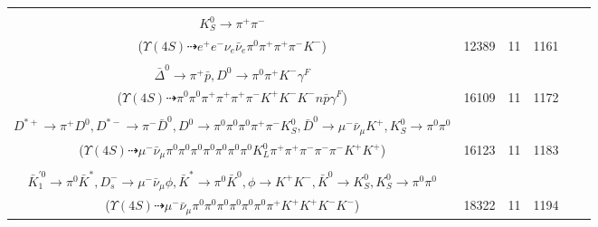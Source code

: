 \documentclass[landscape]{article}
\newcounter{rownumbers}
\newcommand\rn{\stepcounter{rownumbers}\arabic{rownumbers}}
\newcommand{\EOLP}{\\ \hline} %
\newcommand{\topoTags}[1]{#1} %
\begin{document}
\begin{longtable}{clcccc}
\rn & \makecell[l]{ $ 
\Upsilon(4S) \rightarrow B^{0} \bar{B}^{0} ,
B^{0} \rightarrow e^{+} \nu_{e} D^{-} ,
\bar{B}^{0} \rightarrow K^{-} \rho^{+}(1450) ,
D^{-} \rightarrow e^{-} \bar{\nu}_{e} K^{0} ,
\rho^{+}(1450) \rightarrow \pi^{0} \pi^{+} ,
K^{0} \rightarrow K_{S}^{0} ,
$ \\ $
K_{S}^{0} \rightarrow \pi^{+} \pi^{-} 
$ \\ ($
\Upsilon(4S) \dashrightarrow e^{+} e^{-} \nu_{e} \bar{\nu}_{e} \pi^{0} \pi^{+} \pi^{+} \pi^{-} K^{-} 
$) } & \topoTags{12389 & }11 & 1161 \EOLP

\rn & \makecell[l]{ $ 
\Upsilon(4S) \rightarrow B^{0} \bar{B}^{0} ,
B^{0} \rightarrow K^{-} K^{*+} ,
\bar{B}^{0} \rightarrow D^{*+} \Delta^{-} \bar{\Delta}^{0} ,
K^{*+} \rightarrow \pi^{0} K^{+} ,
D^{*+} \rightarrow \pi^{+} D^{0} ,
\Delta^{-} \rightarrow \pi^{-} n ,
$ \\ $
\bar{\Delta}^{0} \rightarrow \pi^{+} \bar{p} ,
D^{0} \rightarrow \pi^{0} \pi^{+} K^{-} \gamma^{F} 
$ \\ ($
\Upsilon(4S) \dashrightarrow \pi^{0} \pi^{0} \pi^{+} \pi^{+} \pi^{+} \pi^{-} K^{+} K^{-} K^{-} n \bar{p} \gamma^{F} 
$) } & \topoTags{16109 & }11 & 1172 \EOLP

\rn & \makecell[l]{ $ 
\Upsilon(4S) \rightarrow B^{0} \bar{B}^{0} ,
B^{0} \rightarrow \rho^{-} K^{*+} ,
\bar{B}^{0} \rightarrow \bar{K}^{0} D^{*+} D^{*-} ,
\rho^{-} \rightarrow \pi^{0} \pi^{-} ,
K^{*+} \rightarrow \pi^{0} K^{+} ,
\bar{K}^{0} \rightarrow K_{L}^{0} ,
$ \\ $
D^{*+} \rightarrow \pi^{+} D^{0} ,
D^{*-} \rightarrow \pi^{-} \bar{D}^{0} ,
D^{0} \rightarrow \pi^{0} \pi^{0} \pi^{0} \pi^{+} \pi^{-} K_{S}^{0} ,
\bar{D}^{0} \rightarrow \mu^{-} \bar{\nu}_{\mu} K^{+} ,
K_{S}^{0} \rightarrow \pi^{0} \pi^{0} 
$ \\ ($
\Upsilon(4S) \dashrightarrow \mu^{-} \bar{\nu}_{\mu} \pi^{0} \pi^{0} \pi^{0} \pi^{0} \pi^{0} \pi^{0} \pi^{0} K_{L}^{0} \pi^{+} \pi^{+} \pi^{-} \pi^{-} \pi^{-} K^{+} K^{+} 
$) } & \topoTags{16123 & }11 & 1183 \EOLP

\rn & \makecell[l]{ $ 
\Upsilon(4S) \rightarrow B^{0} \bar{B}^{0} ,
B^{0} \rightarrow K^{-} K^{*+} ,
\bar{B}^{0} \rightarrow D^{+} D_{s}^{*-} ,
K^{*+} \rightarrow \pi^{0} K^{+} ,
D^{+} \rightarrow \pi^{+} \bar{K}_1^{\prime0} ,
D_{s}^{*-} \rightarrow \pi^{0} D_{s}^{-} ,
$ \\ $
\bar{K}_1^{\prime0} \rightarrow \pi^{0} \bar{K}^{*} ,
D_{s}^{-} \rightarrow \mu^{-} \bar{\nu}_{\mu} \phi ,
\bar{K}^{*} \rightarrow \pi^{0} \bar{K}^{0} ,
\phi \rightarrow K^{+} K^{-} ,
\bar{K}^{0} \rightarrow K_{S}^{0} ,
K_{S}^{0} \rightarrow \pi^{0} \pi^{0} 
$ \\ ($
\Upsilon(4S) \dashrightarrow \mu^{-} \bar{\nu}_{\mu} \pi^{0} \pi^{0} \pi^{0} \pi^{0} \pi^{0} \pi^{0} \pi^{+} K^{+} K^{+} K^{-} K^{-} 
$) } & \topoTags{18322 & }11 & 1194 \EOLP


\end{longtable}
\end{document}
